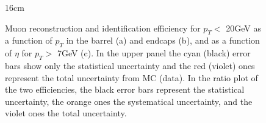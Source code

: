 \begin{figure}[hbtp]{16cm}
	\caption{Muon reconstruction and identification efficiency for $p_{T}<$ 20GeV as a function of $p_{T}$ in the barrel (a) and endcaps (b), and as a function of $\eta$ for $p_{T}>$ 7GeV (c). In the upper panel the cyan (black) error bars show only the statistical uncertainty and the red (violet) ones represent the total uncertainty from MC (data). In the ratio plot of the two efficiencies, the black error bars represent the statistical uncertainty, the orange ones the systematical uncertainty, and the violet ones the total uncertainty.}
	\centering
	\quad

\end{figure}
